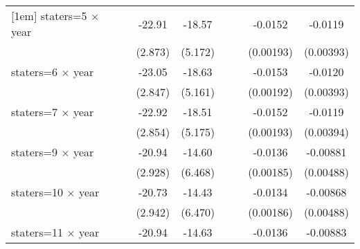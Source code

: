 {\begin{longtable}{l*{8}{c}}
[1em]
staters=5 $\times$ year&                     &                     &      -22.91\sym{***}&      -18.57\sym{***}&                     &                     &     -0.0152\sym{***}&     -0.0119\sym{***}\\
                    &                     &                     &     (2.873)         &     (5.172)         &                     &                     &   (0.00193)         &   (0.00393)         \\
[1em]
staters=6 $\times$ year&                     &                     &      -23.05\sym{***}&      -18.63\sym{***}&                     &                     &     -0.0153\sym{***}&     -0.0120\sym{***}\\
                    &                     &                     &     (2.847)         &     (5.161)         &                     &                     &   (0.00192)         &   (0.00393)         \\
[1em]
staters=7 $\times$ year&                     &                     &      -22.92\sym{***}&      -18.51\sym{***}&                     &                     &     -0.0152\sym{***}&     -0.0119\sym{***}\\
                    &                     &                     &     (2.854)         &     (5.175)         &                     &                     &   (0.00193)         &   (0.00394)         \\
[1em]
staters=9 $\times$ year&                     &                     &      -20.94\sym{***}&      -14.60\sym{**} &                     &                     &     -0.0136\sym{***}&    -0.00881\sym{*}  \\
                    &                     &                     &     (2.928)         &     (6.468)         &                     &                     &   (0.00185)         &   (0.00488)         \\
[1em]
staters=10 $\times$ year&                     &                     &      -20.73\sym{***}&      -14.43\sym{**} &                     &                     &     -0.0134\sym{***}&    -0.00868\sym{*}  \\
                    &                     &                     &     (2.942)         &     (6.470)         &                     &                     &   (0.00186)         &   (0.00488)         \\
[1em]
staters=11 $\times$ year&                     &                     &      -20.94\sym{***}&      -14.63\sym{**} &                     &                     &     -0.0136\sym{***}&    -0.00883\sym{*}  \\

\end{longtable}}
